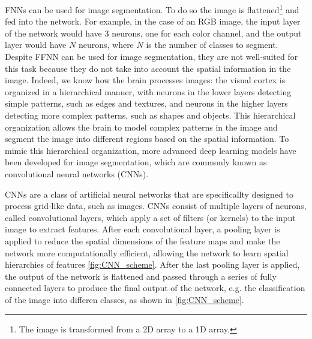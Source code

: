 FNNs can be used for image segmentation. To do so the image is
flattened\footnote{The image is transformed from a 2D array to a 1D array.} and
fed into the network. For example, in the case of an RGB image, the input layer
of the network would have 3 neurons, one for each color channel, and the output
layer would have $N$ neurons, where $N$ is the number of classes to segment.
Despite FFNN can be used for image segmentation, they are not well-suited for
this task because they do not take into account the spatial information in the
image. Indeed, we know how the brain processes images: the visual cortex is
organized in a hierarchical manner, with neurons in the lower layers detecting
simple patterns, such as edges and textures, and neurons in the higher layers
detecting more complex patterns, such as shapes and objects. This hierarchical
organization allows the brain to model complex patterns in the image and
segment the image into different regions based on the spatial information. To
mimic this hierarchical organization, more advanced deep learning models have
been developed for image segmentation, which are commonly known as
convolutional neural networks (CNNs).

CNNs are a class of artificial neural networks that are specificallty designed
to process grid-like data, such as images. CNNs consist of multiple layers of
neurons, called convolutional layers, which apply a set of filters (or kernels)
to the input image to extract features. After each convolutional layer, a
pooling layer is applied to reduce the spatial dimensions of the feature maps
and make the network more computationally efficient, allowing the network to
learn spatial hierarchies of features \cref{fig:CNN_scheme}. After the last
pooling layer is applied, the output of the network is flattened and passed
through a series of fully connected layers to produce the final output of the
network, e.g. the classification of the image into differen classes, as shown
in \cref{fig:CNN_scheme}.

